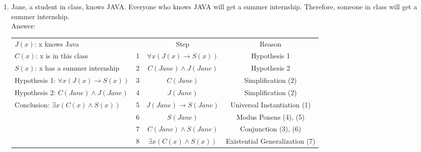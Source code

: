 \begin{enumerate}
\begin{enumerate}
\item Jane, a student in class, knows JAVA. Everyone who knows JAVA will get a summer internship.
         Therefore, someone in class will get a summer internship.\\
         Answer: 
\begin{table}[h]
\centering
\begin{tabular}{lccc}
$J(x)$: x knows Java                                                     &                        & Step                                                       & Reason                                              \\ \cline{2-4} 
\multicolumn{1}{l|}{$C(x)$: x is in this class}                          & \multicolumn{1}{c|}{1} & \multicolumn{1}{c|}{$\forall x ( J(x) \rightarrow S(x) )$} & \multicolumn{1}{c|}{Hypothesis 1}                   \\ \cline{2-4} 
\multicolumn{1}{l|}{$S(x)$: x has a summer internship}                   & \multicolumn{1}{c|}{2} & \multicolumn{1}{c|}{$C(Jane) \wedge J(Jane)$}              & \multicolumn{1}{c|}{Hypothesis 2}                   \\ \cline{2-4} 
\multicolumn{1}{l|}{Hypothesis 1: $\forall x ( J(x) \rightarrow S(x) )$} & \multicolumn{1}{c|}{3} & \multicolumn{1}{c|}{$C(Jane)$}                             & \multicolumn{1}{c|}{Simplification (2)}             \\ \cline{2-4} 
\multicolumn{1}{l|}{Hypothesis 2: $C(Jane) \wedge J(Jane)$}              & \multicolumn{1}{c|}{4} & \multicolumn{1}{c|}{$J(Jane)$}                             & \multicolumn{1}{c|}{Simplification (2)}             \\ \cline{2-4} 
\multicolumn{1}{l|}{Conclusion: $\exists x ( C(x) \wedge S(x) )$}        & \multicolumn{1}{c|}{5} & \multicolumn{1}{c|}{$J(Jane) \rightarrow S(Jane)$}         & \multicolumn{1}{c|}{Universal Instantiation (1)}    \\ \cline{2-4} 
\multicolumn{1}{l|}{}                                                    & \multicolumn{1}{c|}{6} & \multicolumn{1}{c|}{$S(Jane)$}                             & \multicolumn{1}{c|}{Modus Ponens (4), (5)}          \\ \cline{2-4} 
\multicolumn{1}{l|}{}                                                    & \multicolumn{1}{c|}{7} & \multicolumn{1}{c|}{$C(Jane) \wedge S(Jane)$}              & \multicolumn{1}{c|}{Conjunction (3), (6)}           \\ \cline{2-4} 
\multicolumn{1}{l|}{}                                                    & \multicolumn{1}{c|}{8} & \multicolumn{1}{c|}{$\exists x ( C(x) \wedge S(x) )$}      & \multicolumn{1}{c|}{Existential Generalization (7)} \\ \cline{2-4} 
\end{tabular}
\end{table}


\end{enumerate}
\end{enumerate}
